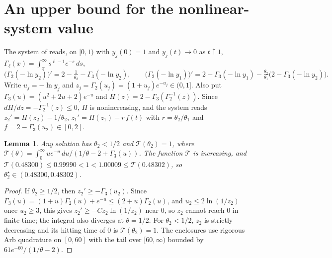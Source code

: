 \documentclass[11pt]{article}
\newtheorem{lemma}[theorem]{Lemma}
\theoremstyle{remark}
\begin{document}
\section{An upper bound for the nonlinear-system value}\label{sec:theta}
The system of \cite{BPV} reads, on $[0,1)$ with $y_j(0)=1$ and $y_j(t)\to0$ as $t\uparrow1$, $\Gamma_\ell(x)=\int_x^\infty s^{\ell-1}e^{-s}\,ds$,
\[
\bigl(\Gamma_2(-\ln y_2)\bigr)' = 2 - \tfrac{1}{\theta_2} - \Gamma_3(-\ln y_2),\qquad
\bigl(\Gamma_2(-\ln y_1)\bigr)' = 2 - \Gamma_3(-\ln y_1) - \tfrac{\theta_2}{\theta_1}\bigl(2 - \Gamma_3(-\ln y_2)\bigr).
\]
Write $u_j=-\ln y_j$ and $z_j=\Gamma_2(u_j)=(1+u_j)e^{-u_j}\in(0,1]$. Also put $\Gamma_3(u)=(u^2+2u+2)e^{-u}$ and $H(z)=2-\Gamma_3(\Gamma_2^{-1}(z))$. Since $dH/dz=-\Gamma_2^{-1}(z)\le 0$, $H$ is nonincreasing, and the system reads $z_2'=H(z_2)-1/\theta_2$, $z_1'=H(z_1)-r\,f(t)$ with $r=\theta_2/\theta_1$ and $f=2-\Gamma_3(u_2)\in[0,2]$.

\begin{lemma}\label{lem:theta2}
Any solution has $\theta_2<1/2$ and $\mathcal T(\theta_2)=1$, where $\mathcal T(\theta)=\int_0^\infty ue^{-u}\,du/(1/\theta-2+\Gamma_3(u))$. The function $\mathcal T$ is increasing, and $\mathcal T(0.48300)\le 0.99990<1<1.00009\le\mathcal T(0.48302)$, so $\theta_2^\star\in(0.48300,0.48302)$.
\end{lemma}
\begin{proof}
If $\theta_2\ge 1/2$, then $z_2'\ge -\Gamma_3(u_2)$. Since $\Gamma_3(u)=(1+u)\Gamma_2(u)+e^{-u}\le(2+u)\Gamma_2(u)$, and $u_2\le 2\ln(1/z_2)$ once $u_2\ge 3$, this gives $z_2'\ge -C z_2\ln(1/z_2)$ near $0$, so $z_2$ cannot reach $0$ in finite time; the integral also diverges at $\theta=1/2$. For $\theta_2<1/2$, $z_2$ is strictly decreasing and its hitting time of $0$ is $\mathcal T(\theta_2)=1$. The enclosures use rigorous Arb quadrature on $[0,60]$ with the tail over $[60,\infty)$ bounded by $61e^{-60}/(1/\theta-2)$.
\end{proof}
\end{document}
